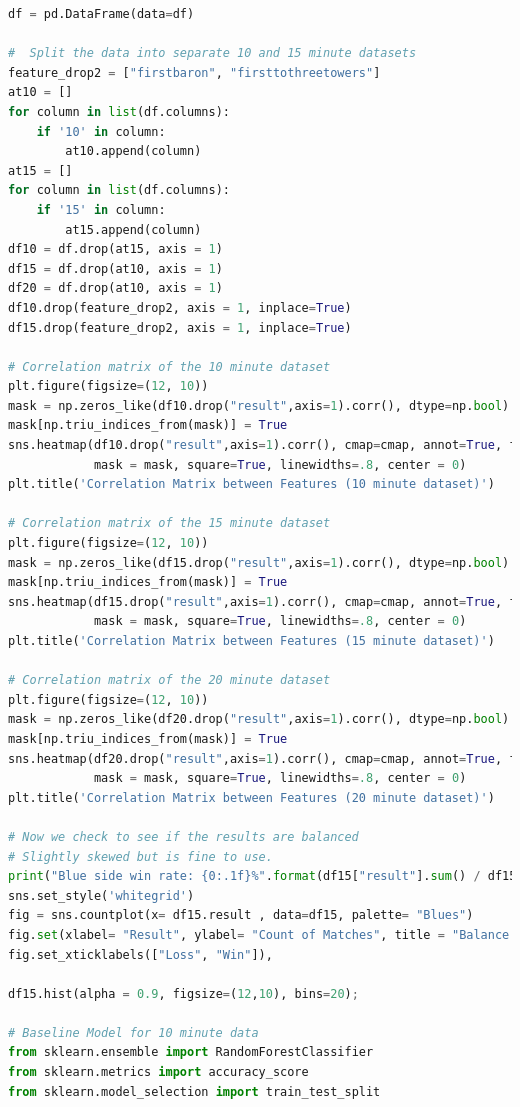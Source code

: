 \begin{lstlisting}[language=python,label={lst:pythoncode}]
df = pd.DataFrame(data=df)

#  Split the data into separate 10 and 15 minute datasets
feature_drop2 = ["firstbaron", "firsttothreetowers"]
at10 = []
for column in list(df.columns):
    if '10' in column:
        at10.append(column)
at15 = []
for column in list(df.columns):
    if '15' in column:
        at15.append(column)
df10 = df.drop(at15, axis = 1)
df15 = df.drop(at10, axis = 1)
df20 = df.drop(at10, axis = 1)
df10.drop(feature_drop2, axis = 1, inplace=True)
df15.drop(feature_drop2, axis = 1, inplace=True)

# Correlation matrix of the 10 minute dataset
plt.figure(figsize=(12, 10))
mask = np.zeros_like(df10.drop("result",axis=1).corr(), dtype=np.bool)
mask[np.triu_indices_from(mask)] = True
sns.heatmap(df10.drop("result",axis=1).corr(), cmap=cmap, annot=True, fmt='.2f', vmin=-1, vmax=1,
            mask = mask, square=True, linewidths=.8, center = 0)
plt.title('Correlation Matrix between Features (10 minute dataset)')

# Correlation matrix of the 15 minute dataset
plt.figure(figsize=(12, 10))
mask = np.zeros_like(df15.drop("result",axis=1).corr(), dtype=np.bool)
mask[np.triu_indices_from(mask)] = True
sns.heatmap(df15.drop("result",axis=1).corr(), cmap=cmap, annot=True, fmt='.2f', vmin=-1, vmax=1,
            mask = mask, square=True, linewidths=.8, center = 0)
plt.title('Correlation Matrix between Features (15 minute dataset)')

# Correlation matrix of the 20 minute dataset
plt.figure(figsize=(12, 10))
mask = np.zeros_like(df20.drop("result",axis=1).corr(), dtype=np.bool)
mask[np.triu_indices_from(mask)] = True
sns.heatmap(df20.drop("result",axis=1).corr(), cmap=cmap, annot=True, fmt='.2f', vmin=-1, vmax=1,
            mask = mask, square=True, linewidths=.8, center = 0)
plt.title('Correlation Matrix between Features (20 minute dataset)')

# Now we check to see if the results are balanced
# Slightly skewed but is fine to use.
print("Blue side win rate: {0:.1f}%".format(df15["result"].sum() / df15["result"].shape[0]*100))
sns.set_style('whitegrid')
fig = sns.countplot(x= df15.result , data=df15, palette= "Blues")
fig.set(xlabel= "Result", ylabel= "Count of Matches", title = "Balance of the dataset")
fig.set_xticklabels(["Loss", "Win"]),

df15.hist(alpha = 0.9, figsize=(12,10), bins=20);

# Baseline Model for 10 minute data
from sklearn.ensemble import RandomForestClassifier
from sklearn.metrics import accuracy_score
from sklearn.model_selection import train_test_split


\end{lstlisting}
